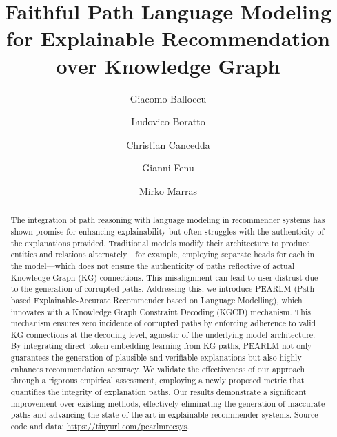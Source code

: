 \documentclass[sigconf]{acmart}
\begin{document}
\title{Faithful Path Language Modeling for Explainable Recommendation over Knowledge Graph}

\author{Giacomo Balloccu}

\author{Ludovico Boratto}


\author{Christian Cancedda}

\author{Gianni Fenu}

\author{Mirko Marras}

\begin{abstract}
The integration of path reasoning with language modeling in recommender systems has shown promise for enhancing explainability but often struggles with the authenticity of the explanations provided. Traditional models modify their architecture to produce entities and relations alternately—for example, employing separate heads for each in the model—which does not ensure the authenticity of paths reflective of actual Knowledge Graph (KG) connections. This misalignment can lead to user distrust due to the generation of corrupted paths. Addressing this, we introduce PEARLM (Path-based Explainable-Accurate Recommender based on Language Modelling), which innovates with a Knowledge Graph Constraint Decoding (KGCD) mechanism. This mechanism ensures zero incidence of corrupted paths by enforcing adherence to valid KG connections at the decoding level, agnostic of the underlying model architecture. By integrating direct token embedding learning from KG paths, PEARLM not only guarantees the generation of plausible and verifiable explanations but also highly enhances recommendation accuracy. We validate the effectiveness of our approach through a rigorous empirical assessment, employing a newly proposed metric that quantifies the integrity of explanation paths. Our results demonstrate a significant improvement over existing methods, effectively eliminating the generation of inaccurate paths and advancing the state-of-the-art in explainable recommender systems. Source code and data: \url{https://tinyurl.com/pearlmrecsys}.
\end{abstract}
\end{document}

